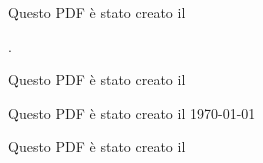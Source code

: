 \documentclass{article}
\begin{document}
	Questo PDF è stato creato il
	
	\DTMnow.
	
	Questo PDF è stato creato il
	
	\DTMNow

Questo PDF è stato creato il \today

Questo PDF è stato creato il \Today

\DTMcurrenttime

\DTMcurrentzone

\end{document}
